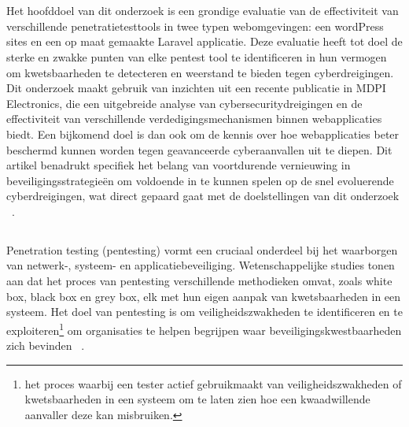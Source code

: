 \chapter{}%
\label{ch:stand-van-zaken}


\section{}

Het hoofddoel van dit onderzoek is een grondige evaluatie van de effectiviteit van verschillende penetratietesttools in twee typen webomgevingen: 
een wordPress sites en een op maat gemaakte Laravel applicatie. Deze evaluatie heeft tot doel de sterke en zwakke punten van 
elke pentest tool te identificeren in hun vermogen om kwetsbaarheden te detecteren en weerstand te bieden 
tegen cyberdreigingen.
Dit onderzoek maakt gebruik van inzichten uit een recente publicatie in MDPI Electronics, die een uitgebreide analyse van cybersecuritydreigingen en 
de effectiviteit van verschillende verdedigingsmechanismen binnen webapplicaties biedt. Een bijkomend doel is dan ook om de kennis over hoe webapplicaties beter 
beschermd kunnen worden tegen geavanceerde cyberaanvallen uit te diepen. Dit artikel benadrukt specifiek het belang van voortdurende vernieuwing 
in beveiligingsstrategieën om voldoende in te kunnen spelen op de snel evoluerende cyberdreigingen, wat direct gepaard gaat met de doelstellingen van dit 
onderzoek ~\autocite{Altulaihan2023}.

\section{}
\label{sec:pentesting}
Penetration testing (pentesting) vormt een cruciaal onderdeel bij het waarborgen van netwerk-, systeem- en applicatiebeveiliging. 
Wetenschappelijke studies tonen aan dat het proces van pentesting verschillende methodieken omvat, zoals white box, 
black box en grey box, elk met hun eigen aanpak van kwetsbaarheden in een systeem. Het doel van pentesting is om 
veiligheidszwakheden te identificeren en te exploiteren\footnote{het proces waarbij een tester actief gebruikmaakt 
van veiligheidszwakheden of kwetsbaarheden in een systeem om te laten zien hoe een kwaadwillende aanvaller deze kan misbruiken.} 
om organisaties te helpen begrijpen waar beveiligingskwestbaarheden zich bevinden ~\autocite{Alhamed2023}.

